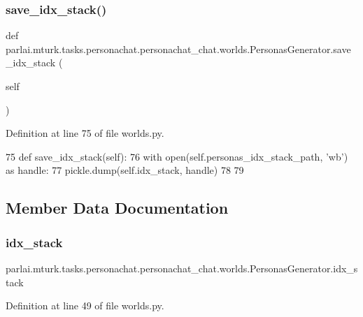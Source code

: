 \subsubsection{\texorpdfstring{save\+\_\+idx\+\_\+stack()}{save\_idx\_stack()}}
{\footnotesize\ttfamily def parlai.\+mturk.\+tasks.\+personachat.\+personachat\+\_\+chat.\+worlds.\+Personas\+Generator.\+save\+\_\+idx\+\_\+stack (\begin{DoxyParamCaption}\item[{}]{self }\end{DoxyParamCaption})}



Definition at line 75 of file worlds.\+py.


\begin{DoxyCode}
75     \textcolor{keyword}{def }save\_idx\_stack(self):
76         with open(self.personas\_idx\_stack\_path, \textcolor{stringliteral}{'wb'}) \textcolor{keyword}{as} handle:
77             pickle.dump(self.idx\_stack, handle)
78 
79 
\end{DoxyCode}


\subsection{Member Data Documentation}
\mbox{\label{classparlai_1_1mturk_1_1tasks_1_1personachat_1_1personachat__chat_1_1worlds_1_1PersonasGenerator_a608c0f26f6e8ca388ce2e336068fae51}} 
\subsubsection{\texorpdfstring{idx\+\_\+stack}{idx\_stack}}
{\footnotesize\ttfamily parlai.\+mturk.\+tasks.\+personachat.\+personachat\+\_\+chat.\+worlds.\+Personas\+Generator.\+idx\+\_\+stack}



Definition at line 49 of file worlds.\+py.

